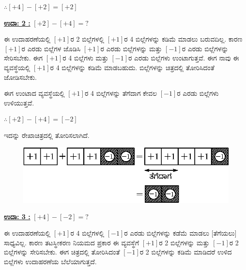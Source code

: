 $\therefore [+4] - [+2] = [+2]$

\noindent
{\textbf{\underline{ಉದಾ: 2 :}}} $[+2] - [+4] = ?$

ಈ ಉದಾಹರಣೆಯಲ್ಲಿ $[+1]$ರ 2 ಬಿಲ್ಲೆಗಳಲ್ಲಿ $[+1]$ರ 4 ಬಿಲ್ಲೆಗಳನ್ನು ಕಡಿಮೆ ಮಾಡಲು ಬರುವದಿಲ್ಲ. ಕಾರಣ $[+1]$ರ ಎರಡು ಬಿಲ್ಲೆಗಳ ಜೊಡಿಸಿ $[+1]$ರ ಎರಡು ಬಿಲ್ಲೆಗಳನ್ನು ಮತ್ತು $[-1]$ರ ಎರಡು ಬಿಲ್ಲೆಗಳನ್ನು ಸೇರಿಸಬೇಕು. ಈಗ $[+1]$ರ 4 ಬಿಲ್ಲೆಗಳು ಮತ್ತು $[-1]$ರ ಎರಡು ಬಿಲ್ಲೆಗಳು ಉಂಟಾಗುತ್ತವೆ. ಈಗ ನಾವು ಈ ವ್ಯವಸ್ಥೆಯಲ್ಲಿ $[+1]$ರ 4 ಬಿಲ್ಲೆಗಳನ್ನು ಕಡಿಮೆ ಮಾಡಬಹುದು. ಬಿಲ್ಲೆಗಳನ್ನು ಚಿತ್ರದಲ್ಲಿ  ತೋರಿಸಿದಂತೆ ಜೋಡಿಸಬೇಕು. 

ಈಗ ಉಂಟಾದ ವ್ಯವಸ್ಥೆಯಲ್ಲಿ $[+1]$ರ 4 ಬಿಲ್ಲೆಗಳನ್ನು ತೆಗೆದಾಗ ಕೇವಲ $[-1]$ರ ಎರಡು ಬಿಲ್ಲೆಗಳು ಉಳಿಯುತ್ತವೆ.

$\therefore [+2] - [+4] = [-2]$


ಇದನ್ನು  ರೇಖಾಚಿತ್ರದಲ್ಲಿ ತೋರಿಸಲಾಗಿದೆ. 
\begin{figure}[H]
\centering
\includegraphics[scale=0.8]{src/figure/chap3/fig3-13b.eps}
\end{figure}

\noindent
{\textbf{\underline{ಉದಾ: 3 :}}} $[+4] - [-2] = ?$

ಈ ಉದಾಹರಣೆಯಲ್ಲಿ $[+1]$ರ 4 ಬಿಲ್ಲೆಗಳಲ್ಲಿ $[-1]$ರ ಎರಡು ಬಿಲ್ಲೆಗಳನ್ನು ಕಡೆಮೆ ಮಾಡಲು [ತೆಗೆಯಲು] ಸಾಧ್ಯವಿಲ್ಲ. ಕಾರಣ ತಟಸ್ಥೀಕರಣ ನಿಯಮದ ಪ್ರಕಾರ ಈ ವ್ಯವಸ್ಥೆಗೆ $[+1]$ರ 2 ಬಿಲ್ಲೆಗಳನ್ನು ಮತ್ತು $[-1]$ರ 2 ಬಿಲ್ಲೆಗಳನ್ನು ಸೇರಿಸಬೇಕು. ಈಗ ಚಿತ್ರದಲ್ಲಿ ತೋರಿಸಿದಂತೆ $[-1]$ರ 2 ಬಿಲ್ಲೆಗಳನ್ನು ಕಡಿಮೆ ಮಾಡಿದರೆ ಉಳಿದ ಬಿಲ್ಲೆಗಳು ಉದಾಹರಣೆಯ ಬೆಲೆಯಾಗುತ್ತದೆ. 

